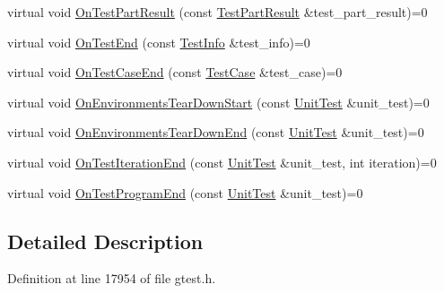 \begin{DoxyCompactItemize}
\item 
virtual void \hyperlink{classtesting_1_1TestEventListener_a6897200761af7db2d3212d5d3c1571d9}{\-On\-Test\-Part\-Result} (const \hyperlink{classtesting_1_1TestPartResult}{\-Test\-Part\-Result} \&test\-\_\-part\-\_\-result)=0
\item 
virtual void \hyperlink{classtesting_1_1TestEventListener_a48d3993f2b69de40ecca5476ff940e24}{\-On\-Test\-End} (const \hyperlink{classtesting_1_1TestInfo}{\-Test\-Info} \&test\-\_\-info)=0
\item 
virtual void \hyperlink{classtesting_1_1TestEventListener_ab92df2852da3e002303be838d8550c76}{\-On\-Test\-Case\-End} (const \hyperlink{classtesting_1_1TestCase}{\-Test\-Case} \&test\-\_\-case)=0
\item 
virtual void \hyperlink{classtesting_1_1TestEventListener_a1246b8fa84a0807afeffa6e986254ee8}{\-On\-Environments\-Tear\-Down\-Start} (const \hyperlink{classtesting_1_1UnitTest}{\-Unit\-Test} \&unit\-\_\-test)=0
\item 
virtual void \hyperlink{classtesting_1_1TestEventListener_a9cc8d7ef2c9e722a301ec4cee20633e2}{\-On\-Environments\-Tear\-Down\-End} (const \hyperlink{classtesting_1_1UnitTest}{\-Unit\-Test} \&unit\-\_\-test)=0
\item 
virtual void \hyperlink{classtesting_1_1TestEventListener_a7e35fec33b744e6a410f10e2fa090015}{\-On\-Test\-Iteration\-End} (const \hyperlink{classtesting_1_1UnitTest}{\-Unit\-Test} \&unit\-\_\-test, int iteration)=0
\item 
virtual void \hyperlink{classtesting_1_1TestEventListener_a543233908c4fd972550c7198c31c895a}{\-On\-Test\-Program\-End} (const \hyperlink{classtesting_1_1UnitTest}{\-Unit\-Test} \&unit\-\_\-test)=0
\end{DoxyCompactItemize}


\subsection{\-Detailed \-Description}


\-Definition at line 17954 of file gtest.\-h.



